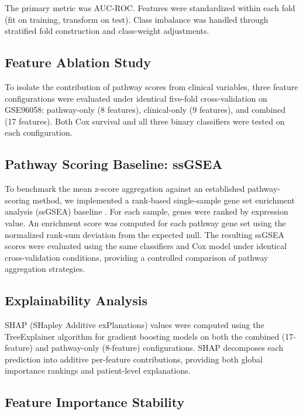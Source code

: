 \documentclass[11pt]{article}
\begin{document}
The primary metric was AUC-ROC. Features were standardized within each fold (fit on training, transform on test). Class imbalance was handled through stratified fold construction and class-weight adjustments.

\subsection{Feature Ablation Study}

To isolate the contribution of pathway scores from clinical variables, three feature configurations were evaluated under identical five-fold cross-validation on GSE96058: pathway-only (8 features), clinical-only (9 features), and combined (17 features). Both Cox survival and all three binary classifiers were tested on each configuration.

\subsection{Pathway Scoring Baseline: ssGSEA}

To benchmark the mean z-score aggregation against an established pathway-scoring method, we implemented a rank-based single-sample gene set enrichment analysis (ssGSEA) baseline \citep{barbie2009}. For each sample, genes were ranked by expression value. An enrichment score was computed for each pathway gene set using the normalized rank-sum deviation from the expected null. The resulting ssGSEA scores were evaluated using the same classifiers and Cox model under identical cross-validation conditions, providing a controlled comparison of pathway aggregation strategies.

\subsection{Explainability Analysis}

SHAP (SHapley Additive exPlanations) values \citep{lundberg2017} were computed using the TreeExplainer algorithm for gradient boosting models on both the combined (17-feature) and pathway-only (8-feature) configurations. SHAP decomposes each prediction into additive per-feature contributions, providing both global importance rankings and patient-level explanations.

\subsection{Feature Importance Stability}
\end{document}
